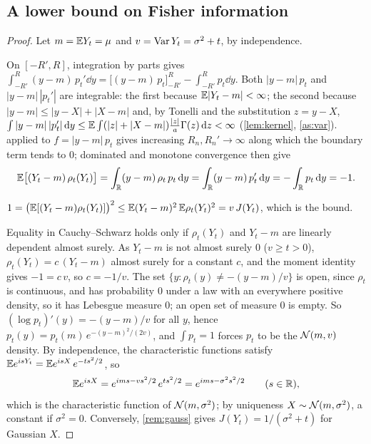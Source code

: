 \documentclass{saim-blog}
\begin{document}
\subsection{A lower bound on Fisher information}
\begin{proof}
Let $m=\mathbb{E} Y_t=\mu$ and $v=\operatorname{Var} Y_t=\sigma^2+t$, by independence.

On $[-R',R]$, integration by parts gives $\int_{-R'}^{R}(y-m)\,p_t'\dd y=\big[(y-m)\,p_t\big]_{-R'}^{R}-\int_{-R'}^{R}p_t\dd y$. Both $|y-m|\,p_t$ and $|y-m|\,|p_t'|$ are integrable: the first because $\mathbb{E}|Y_t-m|<\infty$; the second because $|y-m|\le|y-X|+|X-m|$ and, by Tonelli and the substitution $z=y-X$, $\int|y-m|\,|p_t'|\mathop{}\!\mathrm{d} y\le\mathbb{E}\int(|z|+|X-m|)\tfrac{|z|}{a}\Gamma(z)\mathop{}\!\mathrm{d} z<\infty$ (\cref{lem:kernel}, \cref{as:var}).  applied to $f=|y-m|\,p_t$ gives increasing $R_n,R_n'\to\infty$ along which the boundary term tends to $0$; dominated and monotone convergence then give
\[
\mathbb{E}\big[(Y_t-m)\,\rho_t(Y_t)\big]=\int_{\mathbb{R}}(y-m)\,\rho_t\,p_t\mathop{}\!\mathrm{d} y=\int_{\mathbb{R}}(y-m)\,p_t'\mathop{}\!\mathrm{d} y=-\int_{\mathbb{R}}p_t\mathop{}\!\mathrm{d} y=-1 .
\]

$1=\big(\mathbb{E}[(Y_t-m)\rho_t(Y_t)]\big)^2\le\mathbb{E}(Y_t-m)^2\,\mathbb{E}\rho_t(Y_t)^2=v\,J(Y_t)$, which is the bound.

Equality in Cauchy--Schwarz holds only if $\rho_t(Y_t)$ and $Y_t-m$ are linearly dependent almost surely. As $Y_t-m$ is not almost surely $0$ ($v\ge t>0$), $\rho_t(Y_t)=c\,(Y_t-m)$ almost surely for a constant $c$, and the moment identity gives $-1=c\,v$, so $c=-1/v$. The set $\{y:\rho_t(y)\ne-(y-m)/v\}$ is open, since $\rho_t$ is continuous, and has probability $0$ under a law with an everywhere positive density, so it has Lebesgue measure $0$; an open set of measure $0$ is empty. So $(\log p_t)'(y)=-(y-m)/v$ for all $y$, hence $p_t(y)=p_t(m)\,e^{-(y-m)^2/(2v)}$, and $\int p_t=1$ forces $p_t$ to be the $\mathcal{N}(m,v)$ density. By independence, the characteristic functions satisfy $\mathbb{E} e^{isY_t}=\mathbb{E} e^{isX}\,e^{-ts^2/2}$, so
\[
\mathbb{E} e^{isX}=e^{ims-vs^2/2}\,e^{ts^2/2}=e^{ims-\sigma^2s^2/2}\qquad(s\in\mathbb{R}),
\]
which is the characteristic function of $\mathcal{N}(m,\sigma^2)$; by uniqueness $X\sim\mathcal{N}(m,\sigma^2)$, a constant if $\sigma^2=0$. Conversely, \cref{rem:gauss} gives $J(Y_t)=1/(\sigma^2+t)$ for Gaussian $X$.
\end{proof}
\end{document}
